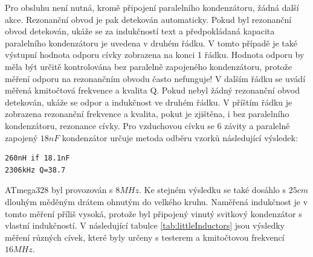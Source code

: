 Pro obsluhu není nutná, kromě připojení paralelního kondenzátoru, žádná další akce.
Rezonanční obvod je pak detekován automaticky.
Pokud byl rezonanční obvod detekován, ukáže se za indukčností text  a předpokládaná
kapacita paralelního kondenzátoru je uvedena v druhém řádku.
V tomto případě je také výstupní hodnota odporu cívky zobrazena na konci 1 řádku.
Hodnota odporu by měla být určitě kontrolována bez paralelně zapojeného kondenzátoru,
protože měření odporu na rezonančním obvodu často nefunguje!
V dalším řádku se uvádí měřená kmitočtová frekvence a kvalita Q.
Pokud nebyl žádný rezonanční obvod detekován, ukáže se odpor a indukčnost ve druhém řádku.
V příštím řádku je zobrazena rezonanční frekvence a kvalita, pokut je zjištěna,
i bez paralelního kondenzátoru, rezonance cívky.
Pro vzduchovou cívku se 6 závity a paralelně zapojený \(18nF\) kondenzátor 
určuje metoda odběru vzorků následující výsledek:

\begin{verbatim}
260nH if 18.1nF
2306kHz Q=38.7
\end{verbatim}

ATmega328 byl provozován s \(8MHz\).
Ke stejném výsledku se také dosáhlo s \(25cm\) dlouhým měděným drátem ohnutým do velkého kruhu.
Naměřená indukčnost je v tomto měření příliš vysoká, protože byl připojený vinutý svitkový
kondenzátor s vlastní indukčností.
V následující tabulce \ref{tab:littleInductors} jsou výsledky měření různých cívek,
které byly určeny s testerem a kmitočtovou frekvencí \(16MHz\).

